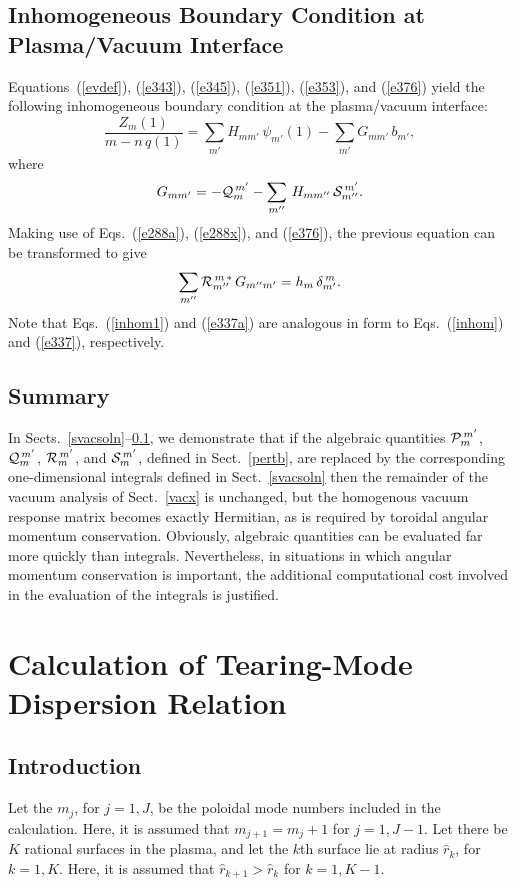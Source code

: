 \documentclass[12pt,prb,aps]{revtex4-1}
\begin{document}
\subsection{Inhomogeneous Boundary Condition at Plasma/Vacuum Interface}\label{svacsoln1}
Equations~(\ref{evdef}), (\ref{e343}), (\ref{e345}), (\ref{e351}), (\ref{e353}),  and (\ref{e376}) yield the
following inhomogeneous boundary condition at the plasma/vacuum interface:
\begin{equation}\label{inhom1}
\frac{Z_m(1)}{m-n\,q(1)} = \sum_{m'}H_{mm'}\,\psi_{m'}(1)-\sum_{m'}G_{mm'}\,b_{m'},
\end{equation}
where 
\begin{equation}
G_{mm'} = -{\cal Q}_m^{\,m'}-\sum_{m''}\,H_{mm''}\,{\cal S}_{m''}^{\,m'}.
\end{equation}
Making use of Eqs.~(\ref{e288a}), (\ref{e288x}), and (\ref{e376}), the previous equation
can be transformed to give 
\begin{equation}\label{e337a}
\sum_{m''} {\cal R}_{m''}^{\,m\,\ast}\,G_{m''m'} = h_{m}\,\delta^{\,m}_{m'}.
\end{equation}
Note that Eqs.~(\ref{inhom1}) and (\ref{e337a}) are  analogous in form to Eqs.~(\ref{inhom}) and (\ref{e337}), respectively. 

\subsection{Summary}
In Sects.~\ref{svacsoln}--\ref{svacsoln1}, we demonstrate that if the algebraic quantities ${\cal P}_m^{\,m'}$, ${\cal Q}_m^{\,m'}$, ${\cal R}_m^{\,m'}$,
and ${\cal S}_m^{\,m'}$, defined in Sect.~\ref{pertb}, are replaced by the corresponding  one-dimensional integrals defined in Sect.~\ref{svacsoln} then the
remainder of the vacuum analysis of Sect.~\ref{vacx} is unchanged, but the homogenous vacuum response matrix becomes exactly Hermitian, as is required by
toroidal angular momentum conservation. Obviously, algebraic quantities can be evaluated far more quickly than integrals. Nevertheless,
in situations in which angular momentum conservation is important, the additional computational cost involved in the evaluation of the integrals
is justified. 

\section{Calculation of  Tearing-Mode Dispersion Relation}
\subsection{Introduction}
Let the $m_j$, for $j=1,J$, be the poloidal mode numbers included in the calculation. Here, it is assumed that $m_{j+1}=m_j+1$ for $j=1,J-1$. 
Let there be $K$ rational surfaces in the plasma, and let the $k$th surface lie at radius $\hat{r}_k$, for $k=1,K$. Here,
it is assumed that $\hat{r}_{k+1}>\hat{r}_k$ for $k=1,K-1$. 
\end{document}
